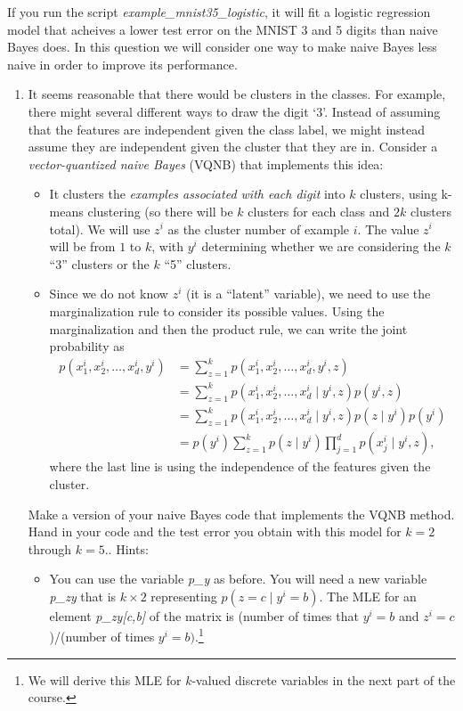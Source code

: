 \documentclass{article}
\def\blu#1{{\color{blu}#1}}
\def\cond{\; | \;}
\def\items#1{\begin{itemize}#1\end{itemize}}
\def\enum#1{\begin{enumerate}#1\end{enumerate}}
\begin{document}
If you run the script \emph{example\_mnist35\_logistic}, it will fit a logistic regression model that acheives a lower test error on the MNIST 3 and 5 digits than naive Bayes does. In this question we will consider one way to make naive Bayes less naive in order to improve its performance.

\enum{
\item It seems reasonable that there would be clusters in the classes. For example, there might several different ways to draw the digit `3'. Instead of assuming that the features are independent given the class label, we might instead assume they are independent given the cluster that they are in. Consider a \emph{vector-quantized naive Bayes} (VQNB) that implements this idea:
\items{
\item It clusters the \emph{examples associated with each digit} into $k$ clusters, using k-means clustering (so there will be $k$ clusters for each class and $2k$ clusters total). We will use $z^i$ as the cluster number of example $i$. The value $z^i$ will be from $1$ to $k$, with $y^i$ determining whether we are considering the $k$ ``3'' clusters or the $k$ ``5'' clusters.
\item Since we do not know $z^i$ (it is a ``latent'' variable), we need to use the marginalization rule to consider its possible values. Using the marginalization and then the product rule, we can write the joint probability as
\begin{align*}
p(x_1^i, x_2^i,\dots,x_d^i, y^i) & = \sum_{z = 1}^k p(x_1^i, x_2^i,\dots,x_d^i, y^i, z)\\
& = \sum_{z=1}^k  p(x_1^i, x_2^i,\dots,x_d^i \cond y^i, z)p(y^i, z)\\
& = \sum_{z=1}^k  p(x_1^i, x_2^i,\dots,x_d^i \cond y^i, z)p(z \cond y^i)p(y^i)\\
& = p(y^i)\sum_{z=1}^k  p(z \cond y^i)\prod_{j=1}^d p(x_j^i \cond y^i, z),
\end{align*}
where the last line is using the independence of the features given the cluster.
}
Make a version of your naive Bayes code that implements the VQNB method. \blu{Hand in your code and the test error you obtain with this model for $k=2$ through $k=5$.}. Hints:
\items{
\item You can use the variable \emph{p\_y} as before. You will need a new variable \emph{p\_zy}  that is $k \times 2$ representing $p(z = c \cond y^i = b)$. The MLE for an element \emph{p\_zy[c,b]} of the matrix is (number of times that $y^i=b$ and $z^i=c$)/(number of times $y^i = b)$.\footnote{We will derive this MLE for $k$-valued discrete variables in the next part of the course.} 
}}
\end{document}
